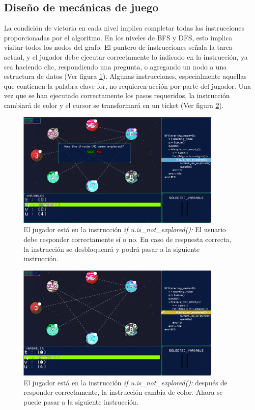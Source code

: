 \subsection{Diseño de mecánicas de juego}

La condición de victoria en cada nivel implica completar todas las instrucciones proporcionadas por el algoritmo. En los niveles de BFS y DFS, esto implica visitar todos los nodos del grafo. El puntero de instrucciones señala la tarea actual, y el jugador debe ejecutar correctamente lo indicado en la instrucción, ya sea haciendo clic, respondiendo una pregunta, o agregando un nodo a una estructura de datos (Ver figura \ref{BFSExplicacion1}). Algunas instrucciones, especialmente aquellas que contienen la palabra clave for, no requieren acción por parte del jugador. Una vez que se han ejecutado correctamente los pasos requeridos, la instrucción cambiará de color y el cursor se transformará en un ticket (Ver figura \ref{BFSExplicacion2}).

\begin{figure}[h]
	\centering
	\includegraphics[width=0.9\textwidth]{imagenes/BFS_Explicacion1.png}
	\caption{El jugador está en la instrucción \textit{if u.is\_not\_explored():} El usuario debe responder correctamente sí o no. En caso de respuesta correcta, la instrucción se desbloqueará y podrá pasar a la siguiente instrucción.}
	\label{BFSExplicacion1}
\end{figure}

\begin{figure}[h]
	\centering
	\includegraphics[width=0.9\textwidth]{imagenes/BFS_Explicacion2.png}
	\caption{El jugador está en la instrucción \textit{if u.is\_not\_explored():} después de responder correctamente, la instrucción cambia de color. Ahora se puede pasar a la siguiente instrucción.}
	\label{BFSExplicacion2}
\end{figure}


